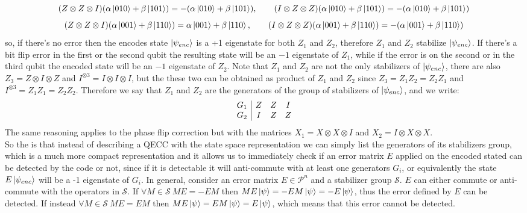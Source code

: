 \documentclass{article}
\begin{document}
	\[(Z\otimes Z \otimes I)(\alpha\ket{010} + \beta\ket{101}) = -(\alpha\ket{010} + \beta\ket{101}),\qquad (I\otimes Z \otimes Z)(\alpha\ket{010} + \beta\ket{101}) = -(\alpha\ket{010} + \beta\ket{101})\]
	\[(Z\otimes Z \otimes I)(\alpha\ket{001} + \beta\ket{110}) = \alpha\ket{001} + \beta\ket{110},\qquad (I\otimes Z \otimes Z)(\alpha\ket{001} + \beta\ket{110}) = -(\alpha\ket{001} + \beta\ket{110})\]
	so, if there's no error then the encodes state $\ket{\psi_{enc}}$ is a +1 eigenstate for both $Z_1$ and $Z_2$, therefore $Z_1$ and $Z_2$ stabilize $\ket{\psi_{enc}}$. If there's a bit flip error in the first or the second qubit the resulting state will be an $-1$ eigenstate of $Z_1$, while if the error is on the second or in the third qubit the encoded state will be an $-1$ eigenstate of $Z_2$. Note that $Z_1$ and $Z_2$ are not the only stabilizers of $\ket{\psi_{enc}}$, there are also $Z_3 = Z \otimes I \otimes Z$ and $I^{\otimes3} = I\otimes I \otimes I$, but the these two can be obtained as product of $Z_1$ and $Z_2$ since $Z_3 = Z_1Z_2 = Z_2Z_1$ and $I^{\otimes3} = Z_1Z_1 = Z_2Z_2$. Therefore we say that $Z_1$ and $Z_2$ are the generators of the group of stabilizers of $\ket{\psi_{enc}}$, and we write:
	\[
	\begin{array}{c|c c c}
		G_1 & Z & Z & I \\
		G_2 & I & Z & Z \\
	\end{array}
	\]
	The same reasoning applies to the phase flip correction but with the matrices $X_1 = X\otimes X \otimes I$ and $X_2 = I \otimes X \otimes X$.\\
	So the is that instead of describing a QECC with the state space representation we can simply list the generators of its stabilizers group, which is a much more compact representation and it allows us to immediately check if an error matrix $E$ applied on the encoded stated can be detected by the code or not, since if it is detectable it will anti-commute with at least one generators $G_i$, or equivalently the state $E\ket{\psi_{enc}}$ will be a -1 eigenstate of $G_i$. In general, consider an error matrix $E \in \mathcal{P}^n$ and a stabilizer group $\mathcal{S}$. $E$ can either commute or anti-commute with the operators in $\mathcal{S}$. If $\forall M \in \mathcal{S}\ ME = -EM$ then $ME\ket{\psi} = -EM\ket{\psi} = -E\ket{\psi}$, thus the error defined by $E$ can be detected. If instead $\forall M \in \mathcal{S}\ ME = EM$ then $ME\ket{\psi} = EM\ket{\psi} = E\ket{\psi}$, which means that this error cannot be detected.\\
\end{document}
